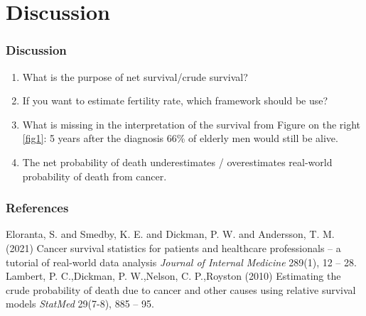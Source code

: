 \documentclass{beamer}
\begin{document}
\section{Discussion}
\begin{frame}
\frametitle{Discussion}
\begin{enumerate}
\item What is the purpose of net survival/crude survival?
\item If you want to estimate fertility rate, which framework should be use? 
\item What is missing in the interpretation of the survival from Figure on the right \ref{fig1}: 5 years after the diagnosis 66\% of elderly men would still be alive.
\item The net probability of death underestimates / overestimates real-world probability of death from cancer.


    
\end{enumerate}
\end{frame}



\begin{frame}
\frametitle{References}
\footnotesize{
\begin{thebibliography}{99} %
 Eloranta, S. and Smedby, K. E. and Dickman, P. W. and Andersson, T. M. (2021)
\newblock Cancer survival statistics for patients and healthcare professionals – a tutorial of real-world data analysis
\newblock \emph{Journal of Internal Medicine} 289(1), 12 -- 28.
 Lambert, P. C.,Dickman, P. W.,Nelson, C. P.,Royston (2010)
\newblock Estimating the crude probability of death due to cancer and other causes using relative survival models
\newblock \emph{StatMed} 29(7-8), 885 -- 95.

\end{thebibliography}
}
\end{frame}


\end{document}
